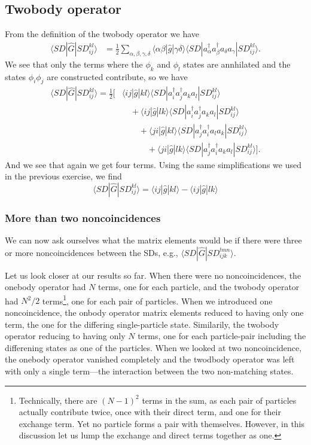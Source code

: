 \documentclass[a4paper, 11pt, notitlepage, english]{article}
\newcommand{\op}[1]{\hat{#1}}
\newcommand{\braopket}[3]{\langle #1 | {#2} | #3 \rangle}
\begin{document}
\subsection*{Twobody operator}
From the definition of the twobody operator we have
\begin{align*}
\braopket{SD}{\op{G}}{SD_{ij}^{kl}}
&= \frac{1}{2}\sum_{\alpha, \beta, \gamma, \delta} \braopket{\alpha\beta}{\op{g}}{\gamma\delta}\braopket{SD}{a_\alpha^\dag a_\beta^\dag a_\delta a_\gamma}{SD_{ij}^{kl}}.
\end{align*}
We see that only the terms where the $\phi_k$ and $\phi_l$ states are annhilated and the states $\phi_i \phi_j$ are constructed contribute, so we have
\begin{align*}
\braopket{SD}{\op{G}}{SD_{ij}^{kl}}
= \frac{1}{2}\big[
&\braopket{i j}{\op{g}}{k l}\braopket{SD}{a_i^\dag a_j^\dag a_k a_l}{SD_{ij}^{kl}} \\[-0.1cm]
&\quad+ \braopket{i j}{\op{g}}{l k}\braopket{SD}{a_i^\dag a_j^\dag a_k a_l}{SD_{ij}^{kl}} \\
&\qquad+ \braopket{j i}{\op{g}}{k l}\braopket{SD}{a_j^\dag a_i^\dag a_l a_k}{SD_{ij}^{kl}} \\
&\qquad\quad+ \braopket{j i}{\op{g}}{l k}\braopket{SD}{a_j^\dag a_i^\dag a_k a_l}{SD_{ij}^{kl}}\big].
\end{align*}
And we see that again we get four terms. Using the same simplifications we used in the previous exercise, we find
$$\braopket{SD}{\op{G}}{SD_{ij}^{kl}} = \braopket{ij}{\op{g}}{kl} - \braopket{ij}{\op{g}}{lk}$$

\clearpage 

\subsubsection*{More than two noncoincidences}
We can now ask ourselves what the matrix elements would be if there were three or more noncoincidences between the SDs, e.g., $\braopket{SD}{\op{G}}{SD_{ijk}^{lmn}}$.

Let us look closer at our results so far. When there were no noncoincidences, the onebody operator had $N$ terms, one for each particle, and the twobody operator had $N^2/2$ terms\footnote{Technically, there are $(N-1)^2$ terms in the sum, as each pair of particles actually contribute twice, once with their direct term, and one for their exchange term. Yet no particle forms a pair with themselves. However, in this discussion let us lump the exchange and direct terms together as one.}, one for each pair of particles. When we introduced one noncoincidence, the onbody operator matrix elements reduced to having only one term, the one for the differing single-particle state. Similarily, the twobody operator reducing to having only $N$ terms, one for each particle-pair including the differening states as one of the particles. When we looked at two noncoincidence, the onebody operator vanished completely and the twodbody operator was left with only a single term---the interaction between the two non-matching states. 
\end{document}
